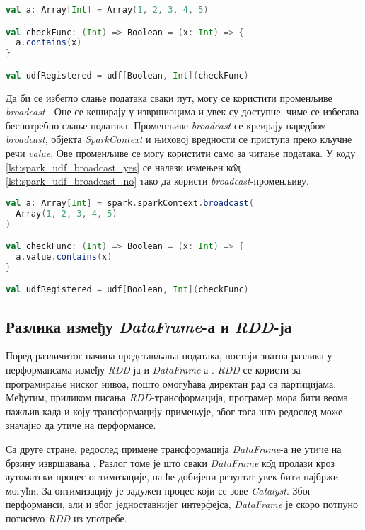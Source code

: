 \documentclass[12pt,oneside]{memoir}
\begin{document}
\begin{lstlisting}[caption={Пример коришћења променљиве дефинисане ван тела \textit{udf}-а}, language=Scala, label={lst:spark_udf_broadcast_no}]
val a: Array[Int] = Array(1, 2, 3, 4, 5)

val checkFunc: (Int) => Boolean = (x: Int) => {
  a.contains(x)
}

val udfRegistered = udf[Boolean, Int](checkFunc)
\end{lstlisting}

Да би се избегло слање података сваки пут, могу се користити променљиве \textit{broadcast} \cite{spark_broadcast}. Оне се кеширају у извршиоцима и увек су доступне, чиме се избегава беспотребно слање података. Променљиве \textit{broadcast} се креирају наредбом \textit{broadcast}, објекта \textit{SparkContext} и њиховој вредности се приступа преко кључне речи \textit{value}. Ове променљиве се могу користити само за читање података. У коду  \ref{lst:spark_udf_broadcast_yes} се налази измењен к\^{о}д \ref{lst:spark_udf_broadcast_no} тако да користи \textit{broadcast}-променљиву.

\begin{lstlisting}[caption={Пример коришћења променљиве \textit{broadcast}}, language=Scala, label={lst:spark_udf_broadcast_yes}]
val a: Array[Int] = spark.sparkContext.broadcast(
  Array(1, 2, 3, 4, 5)
)

val checkFunc: (Int) => Boolean = (x: Int) => {
  a.value.contains(x)
}

val udfRegistered = udf[Boolean, Int](checkFunc)
\end{lstlisting}

\subsection{Разлика између \textit{DataFrame}-а и \textit{RDD}-ја}
\label{subsec:spark_df_vs_rdd}

Поред различитог начина представљања података, постоји знатна разлика у перформансама између \textit{RDD}-ја и \textit{DataFrame}-а \cite{spark_guide}. \textit{RDD} се користи за програмирање ниског нивоа, пошто омогућава директан рад са партицијама. Међутим, приликом писања \textit{RDD}-трансформација, програмер мора бити веома пажљив када и коју трансформацију примењује, због тога што редослед може значајно да утиче на перформансе.

Са друге стране, редослед примене трансформација \textit{DataFrame}-а не утиче на брзину извршавања \cite{spark_guide}. Разлог томе је што сваки \textit{DataFrame} к\^{о}д пролази кроз аутоматски процес оптимизације, па ће добијени резултат увек бити најбржи могући. За оптимизацију је задужен процес који се зове \textit{Catalyst}. Због перформанси, али и због једноставнијег интерфејса, \textit{DataFrame} је скоро потпуно потиснуо \textit{RDD} из употребе.
\end{document}
